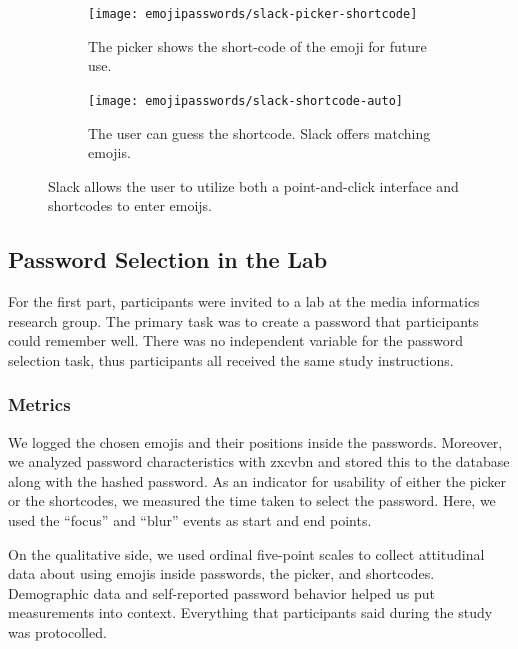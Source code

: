 \begin{figure}
	\centering
	\begin{subfigure}[t]{0.49\textwidth}
	\texttt{[image: emojipasswords/slack-picker-shortcode]}
	\caption{\label{fig:emojipasswords:slack-picker} The picker shows the short-code of the emoji for future use.}
	\end{subfigure}
	\begin{subfigure}[t]{0.49\textwidth}
	\texttt{[image: emojipasswords/slack-shortcode-auto]}
	\caption{\label{fig:emojipasswords:slack-picker-shortcode} The user can guess the shortcode. Slack offers matching emojis.}
	\end{subfigure}
	\caption{\label{fig:emojipasswords:slack-emoji-interaction}
		Slack allows the user to utilize both a point-and-click interface and shortcodes to enter emoijs.
	} 
\end{figure}


\subsection{Password Selection in the Lab}
For the first part, participants were invited to a lab at the media informatics research group. The primary task was to create a password that participants could remember well. There was no independent variable for the password selection task, thus participants all received the same study instructions. 

\subsubsection{Metrics}
We logged the chosen emojis and their positions inside the passwords. Moreover, we analyzed password characteristics with zxcvbn and stored this to the database along with the hashed password. 
As an indicator for usability of either the picker or the shortcodes, we measured the time taken to select the password. Here, we used the ``focus'' and ``blur'' events as start and end points. 

On the qualitative side, we used ordinal five-point scales to collect attitudinal data about using emojis inside passwords, the picker, and shortcodes. Demographic data and self-reported password behavior helped us put measurements into context. 
Everything that participants said during the study was protocolled. 

